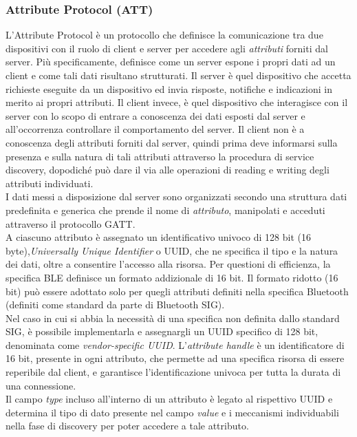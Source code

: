 \subsubsection{Attribute Protocol (ATT)}
L'Attribute Protocol è un protocollo che definisce la comunicazione tra due dispositivi con il ruolo di client e server per accedere agli \textit{attributi} forniti dal server. Più specificamente, definisce come un server espone i propri dati ad un client e come tali dati risultano strutturati.
Il server è quel dispositivo che accetta richieste eseguite da un dispositivo ed invia risposte, notifiche e indicazioni in merito ai propri attributi. %
Il client invece, è quel dispositivo che interagisce con il server con lo scopo di entrare a conoscenza dei dati esposti dal server e all'occorrenza controllare il comportamento del server. Il client non è a conoscenza degli attributi forniti dal server, quindi prima deve informarsi sulla presenza e sulla natura di tali attributi attraverso la procedura di service discovery, dopodiché può dare il via alle operazioni di reading e writing degli attributi individuati.\\
I dati messi a disposizione dal server sono organizzati secondo una struttura dati predefinita e generica che prende il nome di \textit{attributo}, manipolati e acceduti attraverso il protocollo GATT.\\
A ciascuno attributo è assegnato un identificativo univoco di 128 bit (16 byte),\textit{Universally Unique Identifier} o UUID, che ne specifica il tipo e la natura dei dati, oltre a consentire l'accesso alla risorsa. Per questioni di efficienza, la specifica BLE definisce un formato addizionale di 16 bit. Il formato ridotto (16 bit) può essere adottato solo per quegli attributi definiti nella specifica Bluetooth (definiti come standard da parte di Bluetooth SIG). \\
Nel caso in cui si abbia la necessità di una specifica non definita dallo standard SIG, è possibile implementarla e assegnargli un UUID specifico di 128 bit, denominata come \textit{vendor-specific UUID}.
L'\textit{attribute handle} è un identificatore di 16 bit, presente in ogni attributo, che permette ad una specifica risorsa di essere reperibile dal client, e garantisce l'identificazione univoca per tutta la durata di una connessione.\\
Il campo \textit{type} incluso all'interno di un attributo è legato al rispettivo UUID e determina il tipo di dato presente nel campo \textit{value} e i meccanismi individuabili nella fase di discovery per poter accedere a tale attributo.\\
